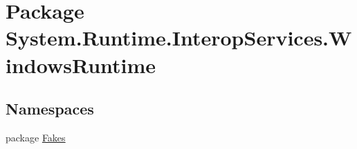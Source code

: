 \hypertarget{namespace_system_1_1_runtime_1_1_interop_services_1_1_windows_runtime}{\section{Package System.\-Runtime.\-Interop\-Services.\-Windows\-Runtime}
\label{namespace_system_1_1_runtime_1_1_interop_services_1_1_windows_runtime}
}
\subsection*{Namespaces}
\begin{DoxyCompactItemize}
\item 
package \hyperlink{namespace_system_1_1_runtime_1_1_interop_services_1_1_windows_runtime_1_1_fakes}{Fakes}
\end{DoxyCompactItemize}
